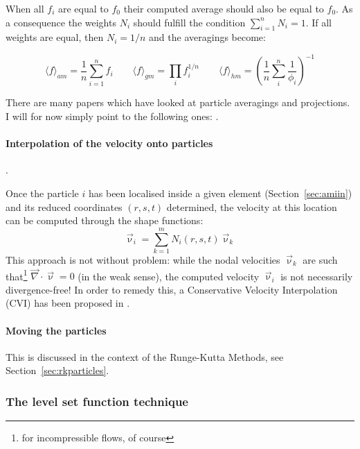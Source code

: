 When all $f_i$ are equal to $f_0$ their computed average should also be equal to $f_0$. As a consequence the 
weights $N_i$ should fulfill the condition $\sum\limits_{i=1}^n N_i=1$.
If all weights are equal, then $N_i=1/n$ and the averagings become:

\begin{equation}
\langle f\rangle_{am} = \frac{1}{n} \sum\limits_{i=1}^n f_i
\qquad
\langle f\rangle_{gm} = \prod_i f_i^{1/n} 
\qquad
\langle f\rangle_{hm} = \left( \frac{1}{n}\sum_i^n \frac{1}{\phi_i} \right)^{-1}
\end{equation}

There are many papers which have looked at particle averagings and projections. 
I will for now simply point to the following ones:
\cite{scbe08}
\cite{deka08}
\cite{dumg11}
\cite{modm03}
\cite{poso08}
\cite{thmk14}
\cite{galh18}.



\paragraph{Interpolation of the velocity onto particles}.

Once the particle $i$ has been localised inside a given element (Section~\ref{sec:amiin}) 
and its reduced coordinates $(r,s,t)$ determined, the velocity at this location can 
be computed through the shape functions:
\[
\vec\upnu_i=\sum_{k=1}^m N_i(r,s,t) \vec\upnu_k
\]
This approach is not without problem: while the nodal velocities $\vec\upnu_k$ are such 
that\footnote{for incompressible flows, of course} 
$\vec\nabla\cdot\vec\upnu=0$ (in the weak sense), the computed velocity $\vec\upnu_i$ 
is not necessarily divergence-free! In order to remedy this, a 
Conservative Velocity Interpolation (CVI) has been proposed in \cite{waav15}.


\paragraph{Moving the particles}

This is discussed in the context of the Runge-Kutta Methods, see Section~\ref{sec:rkparticles}.



\subsubsection{The level set function technique}
    

